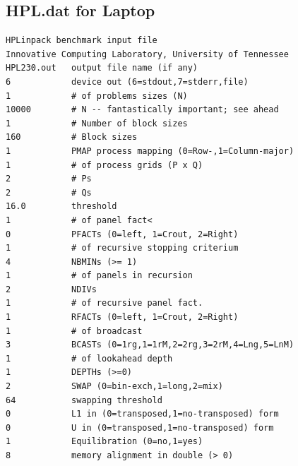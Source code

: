 \documentclass[10pt,twocolumn]{article}
\begin{document}
\begin{appendices}
\section{HPL.dat for Laptop}
\label{sec:appendixHPLdatLaptop}
\begin{lstlisting}
HPLinpack benchmark input file
Innovative Computing Laboratory, University of Tennessee
HPL230.out   output file name (if any)
6            device out (6=stdout,7=stderr,file)
1            # of problems sizes (N)
10000		 # N -- fantastically important; see ahead
1            # Number of block sizes
160		     # Block sizes
1            PMAP process mapping (0=Row-,1=Column-major)
1            # of process grids (P x Q)
2            # Ps
2            # Qs
16.0         threshold
1            # of panel fact<
0            PFACTs (0=left, 1=Crout, 2=Right)
1            # of recursive stopping criterium
4            NBMINs (>= 1)
1            # of panels in recursion
2            NDIVs
1            # of recursive panel fact.
1            RFACTs (0=left, 1=Crout, 2=Right)
1            # of broadcast
3            BCASTs (0=1rg,1=1rM,2=2rg,3=2rM,4=Lng,5=LnM)
1            # of lookahead depth
1            DEPTHs (>=0)
2            SWAP (0=bin-exch,1=long,2=mix)
64           swapping threshold
0            L1 in (0=transposed,1=no-transposed) form
0            U in (0=transposed,1=no-transposed) form
1            Equilibration (0=no,1=yes)
8            memory alignment in double (> 0)
\end{lstlisting}

\end{appendices}
\end{document}
